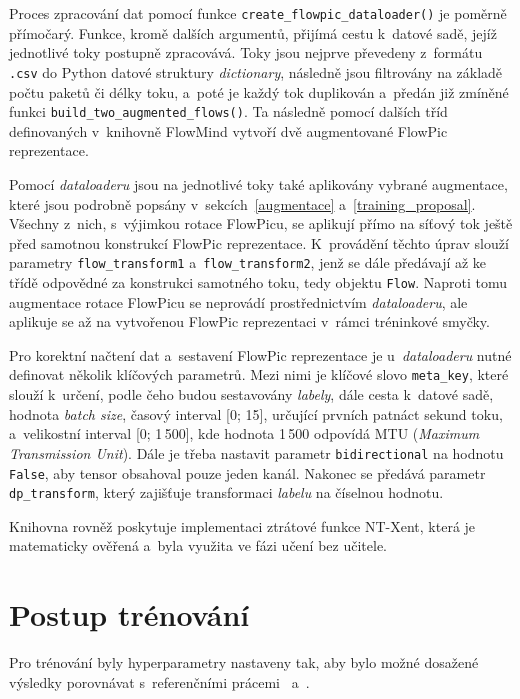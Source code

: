 Proces zpracování dat pomocí funkce \texttt{create\_flowpic\_dataloader()} je poměrně přímočarý. Funkce, kromě dalších argumentů, přijímá cestu k~datové sadě, jejíž jednotlivé toky postupně zpracovává. Toky jsou nejprve převedeny z~formátu \texttt{.csv} do Python datové struktury \textit{dictionary}, následně jsou filtrovány na základě počtu paketů či délky toku, a~poté je každý tok duplikován a~předán již zmíněné funkci \texttt{build\_two\_augmented\_flows()}. Ta následně pomocí dalších tříd definovaných v~knihovně FlowMind vytvoří dvě augmentované FlowPic reprezentace.

Pomocí \textit{dataloaderu} jsou na jednotlivé toky také aplikovány vybrané augmentace, které jsou podrobně popsány v~sekcích~\ref{augmentace} a~\ref{training_proposal}. Všechny z~nich, s~výjimkou rotace FlowPicu, se aplikují přímo na síťový tok ještě před samotnou konstrukcí FlowPic reprezentace. K~provádění těchto úprav slouží parametry \texttt{flow\_transform1} a~\texttt{flow\_transform2}, jenž se dále předávají až ke třídě odpovědné za konstrukci samotného toku, tedy objektu \texttt{Flow}. Naproti tomu augmentace rotace FlowPicu se neprovádí prostřednictvím \textit{dataloaderu}, ale aplikuje se až na vytvořenou FlowPic reprezentaci v~rámci tréninkové smyčky.

Pro korektní načtení dat a~sestavení FlowPic reprezentace je u~\textit{dataloaderu} nutné definovat několik klíčových parametrů. Mezi nimi je klíčové slovo \texttt{meta\_key}, které slouží k~určení, podle čeho budou sestavovány \textit{labely}, dále cesta k~datové sadě, hodnota \textit{batch size}, časový interval [0; 15], určující prvních patnáct sekund toku, a~velikostní interval [0; 1\,500], kde hodnota 1\,500 odpovídá MTU (\textit{Maximum Transmission Unit}). Dále je třeba nastavit parametr \texttt{bidirectional} na hodnotu \texttt{False}, aby tensor obsahoval pouze jeden kanál. Nakonec se předává parametr \texttt{dp\_transform}, který zajišťuje transformaci \textit{labelu} na číselnou hodnotu.

Knihovna rovněž poskytuje implementaci ztrátové funkce NT-Xent, která je matematicky ověřená a~byla využita ve fázi učení bez učitele.

\section{Postup trénování}
Pro trénování byly hyperparametry nastaveny tak, aby bylo možné dosažené výsledky porovnávat s~referenčními prácemi~\cite{flowpic_augmentations} a~\cite{huawei_paper}. 

